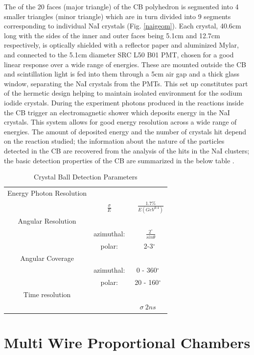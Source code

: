 \indent The of the 20 faces (major triangle) of the CB polyhedron is segmented into 4 smaller triangles (minor triangle)  which  are in turn divided into 9 segments corresponding to individual NaI crystals (Fig. \ref{naigeom}). Each crystal, 40.6cm long with the sides of the inner and outer faces being 5.1cm and 12.7cm respectively, is optically shielded with a reflector paper and aluminized Mylar, and connected to the 5.1cm diameter SRC L50 B01 PMT, chosen for a good linear response over a wide range of energies. These are mounted outside the CB and scintillation light is fed into them through a 5cm air gap and a thick glass window, separating the NaI crystals from the PMTs. This set up constitutes part of the hermetic design helping to maintain isolated environment for the sodium iodide crystals. During the experiment photons produced in the reactions inside the CB trigger an electromagnetic shower which deposits energy in the NaI crystals. This system allows for good energy resolution across a wide range of energies. The amount of deposited energy and the number of crystals hit depend on the reaction studied; the  information  about  the  nature  of  the  particles  detected  in  the  CB  are recovered from the analysis of the hits in the NaI clusters; the basic detection properties  of  the  CB  are  summarized  in  the  below  table \cite {starostin}.
 
\begin{table}[ht]
\caption{Crystal Ball Detection Parameters}
\centering
\begin{tabular}{c c c}
\hline\hline
Energy Photon Resolution & &  \\
 & $\frac{\sigma}{E}$ & ~ $\frac{1.7\%}{E(GeV^{0.4})}$ \\
\hline
Angular Resolution & & \\
 & azimuthal: & ~ $\frac{2^{\circ}}{sin\theta}$ \\
 & polar: & ~2-3$^{\circ}$ \\
\hline
Angular Coverage & & \\
 & azimuthal: & 0 - 360$^{\circ}$ \\
 & polar: & 20 - 160$^{\circ}$ \\
\hline
Time resolution & & \\
 & & $\sigma ~ 2ns$ \\ [1ex]
\hline\hline
\end{tabular}
\label{table_cbparam}
\end{table} 
 

\section{Multi Wire Proportional Chambers}

